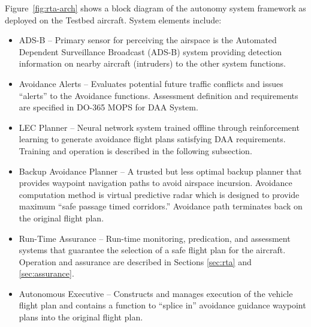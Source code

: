 Figure~\ref{fig:rta-arch} shows a block diagram of the autonomy system framework as deployed on the Testbed aircraft.
System elements include: 
\begin{itemize}
\item ADS-B – Primary sensor for perceiving the airspace is the Automated Dependent Surveillance Broadcast (ADS-B) system providing detection information on  nearby aircraft (intruders) to the other system functions.
\item Avoidance Alerts – Evaluates potential future traffic conflicts and issues “alerts” to the Avoidance functions.  Assessment definition and requirements are specified in DO-365 MOPS for DAA System.
\item LEC Planner -- Neural network system trained offline through reinforcement learning to generate avoidance flight plans satisfying DAA requirements.  Training and operation is described in the following subsection.  
\item Backup Avoidance Planner – A trusted but less optimal backup planner that provides waypoint navigation paths to avoid airspace incursion.  Avoidance computation method is virtual predictive radar which is designed to provide maximum ``safe passage timed corridors.''  Avoidance path terminates back on the original flight plan.
\item Run-Time Assurance  – Run-time monitoring, predication, and assessment systems that guarantee the selection of a safe flight plan for the aircraft.  Operation and assurance are described in Sections \ref{sec:rta} and \ref{sec:assurance}.
\item Autonomous Executive – Constructs and manages execution of the vehicle flight plan and contains a function to ``splice in'' avoidance guidance waypoint plans into the original flight plan.
\end{itemize}

